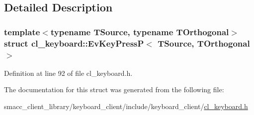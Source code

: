\subsection{Detailed Description}
\subsubsection*{template$<$typename T\+Source, typename T\+Orthogonal$>$\newline
struct cl\+\_\+keyboard\+::\+Ev\+Key\+Press\+P$<$ T\+Source, T\+Orthogonal $>$}



Definition at line 92 of file cl\+\_\+keyboard.\+h.



The documentation for this struct was generated from the following file\+:\begin{DoxyCompactItemize}
\item 
smacc\+\_\+client\+\_\+library/keyboard\+\_\+client/include/keyboard\+\_\+client/\hyperlink{cl__keyboard_8h}{cl\+\_\+keyboard.\+h}\end{DoxyCompactItemize}
